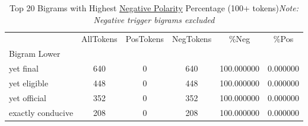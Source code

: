 

\singlespacing
\scriptsize\noindent
\begin{table}
\centering
\caption{Top 20 Bigrams with Highest \underline{Negative Polarity} Percentage (100+ tokens)\textit{Note: Negative trigger bigrams excluded}}
\label{tab:top-bigram-NegPercent}
\begin{tabular}{*{1}{l}S[table-auto-round, table-format=7.2, drop-zero-decimal]
    S[table-auto-round, table-format=7.2, drop-zero-decimal]
    S[table-auto-round, table-format=7.2, drop-zero-decimal]
    S[table-auto-round, table-format=7.2, drop-zero-decimal]
    S[table-auto-round, table-format=7.2, drop-zero-decimal]}
\toprule
{} & {AllTokens} & {PosTokens} & {NegTokens} & {\%Neg} & {\%Pos} \\
{Bigram Lower} & {} & {} & {} & {} & {} \\
\midrule
yet final & {} \color[HTML]{F1F1F1} 640 & {} \color[HTML]{000000} 0 & {} \color[HTML]{F1F1F1} 640 & {} \color[HTML]{F1F1F1} 100.000000 & {} \color[HTML]{000000} 0.000000 \\
yet eligible & {} \color[HTML]{F1F1F1} 448 & {} \color[HTML]{000000} 0 & {} \color[HTML]{F1F1F1} 448 & {} \color[HTML]{F1F1F1} 100.000000 & {} \color[HTML]{000000} 0.000000 \\
yet official & {} \color[HTML]{000000} 352 & {} \color[HTML]{000000} 0 & {} \color[HTML]{000000} 352 & {} \color[HTML]{F1F1F1} 100.000000 & {} \color[HTML]{000000} 0.000000 \\
exactly conducive & {} \color[HTML]{000000} 208 & {} \color[HTML]{000000} 0 & {} \color[HTML]{000000} 208 & {} \color[HTML]{F1F1F1} 100.000000 & {} \color[HTML]{000000} 0.000000 \\

\end{tabular}
\end{table}
